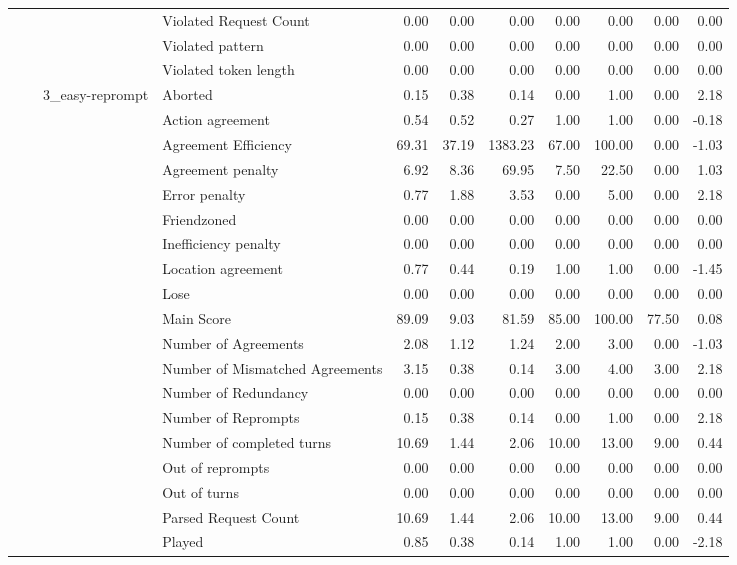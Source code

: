 \begin{tabular}{llllrrrrrrr}
 &  &  & Violated Request Count & 0.00 & 0.00 & 0.00 & 0.00 & 0.00 & 0.00 & 0.00 \\
 &  &  & Violated pattern & 0.00 & 0.00 & 0.00 & 0.00 & 0.00 & 0.00 & 0.00 \\
 &  &  & Violated token length & 0.00 & 0.00 & 0.00 & 0.00 & 0.00 & 0.00 & 0.00 \\
\cline{3-11}
 &  & \multirow[t]{27}{*}{3_easy-reprompt} & Aborted & 0.15 & 0.38 & 0.14 & 0.00 & 1.00 & 0.00 & 2.18 \\
 &  &  & Action agreement & 0.54 & 0.52 & 0.27 & 1.00 & 1.00 & 0.00 & -0.18 \\
 &  &  & Agreement Efficiency & 69.31 & 37.19 & 1383.23 & 67.00 & 100.00 & 0.00 & -1.03 \\
 &  &  & Agreement penalty & 6.92 & 8.36 & 69.95 & 7.50 & 22.50 & 0.00 & 1.03 \\
 &  &  & Error penalty & 0.77 & 1.88 & 3.53 & 0.00 & 5.00 & 0.00 & 2.18 \\
 &  &  & Friendzoned & 0.00 & 0.00 & 0.00 & 0.00 & 0.00 & 0.00 & 0.00 \\
 &  &  & Inefficiency penalty & 0.00 & 0.00 & 0.00 & 0.00 & 0.00 & 0.00 & 0.00 \\
 &  &  & Location agreement & 0.77 & 0.44 & 0.19 & 1.00 & 1.00 & 0.00 & -1.45 \\
 &  &  & Lose & 0.00 & 0.00 & 0.00 & 0.00 & 0.00 & 0.00 & 0.00 \\
 &  &  & Main Score & 89.09 & 9.03 & 81.59 & 85.00 & 100.00 & 77.50 & 0.08 \\
 &  &  & Number of Agreements & 2.08 & 1.12 & 1.24 & 2.00 & 3.00 & 0.00 & -1.03 \\
 &  &  & Number of Mismatched Agreements & 3.15 & 0.38 & 0.14 & 3.00 & 4.00 & 3.00 & 2.18 \\
 &  &  & Number of Redundancy & 0.00 & 0.00 & 0.00 & 0.00 & 0.00 & 0.00 & 0.00 \\
 &  &  & Number of Reprompts & 0.15 & 0.38 & 0.14 & 0.00 & 1.00 & 0.00 & 2.18 \\
 &  &  & Number of completed turns & 10.69 & 1.44 & 2.06 & 10.00 & 13.00 & 9.00 & 0.44 \\
 &  &  & Out of reprompts & 0.00 & 0.00 & 0.00 & 0.00 & 0.00 & 0.00 & 0.00 \\
 &  &  & Out of turns & 0.00 & 0.00 & 0.00 & 0.00 & 0.00 & 0.00 & 0.00 \\
 &  &  & Parsed Request Count & 10.69 & 1.44 & 2.06 & 10.00 & 13.00 & 9.00 & 0.44 \\
 &  &  & Played & 0.85 & 0.38 & 0.14 & 1.00 & 1.00 & 0.00 & -2.18 \\

\end{tabular}

